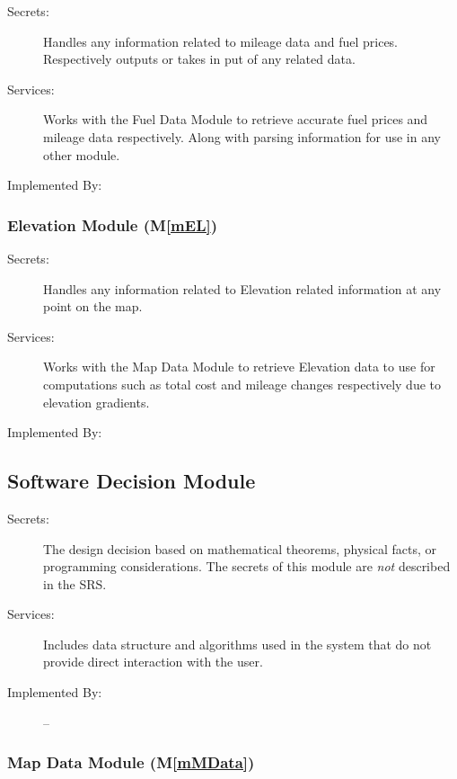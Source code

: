 \documentclass[12pt, titlepage]{article}
\newcommand{\mref}[1]{M\ref{#1}}
\begin{document}
\begin{description}
\item[Secrets:] Handles any information related to mileage data and fuel prices. Respectively 
outputs or takes in put of any related data.
\item[Services:] Works with the Fuel Data Module to retrieve accurate fuel prices and mileage 
data respectively. Along with parsing information for use in any other module.
\item[Implemented By:] \progname{}
\end{description}

\subsubsection{Elevation Module (\mref{mEL})}

\begin{description}
\item[Secrets:] Handles any information related to Elevation related information at any point 
on the map.
\item[Services:] Works with the Map Data Module to retrieve Elevation data to use for computations 
such as total cost and mileage changes respectively due to elevation gradients.
\item[Implemented By:] \progname{}
\end{description}


\subsection{Software Decision Module}

\begin{description}
\item[Secrets:] The design decision based on mathematical theorems, physical
  facts, or programming considerations. The secrets of this module are
  \emph{not} described in the SRS.
\item[Services:] Includes data structure and algorithms used in the system that
  do not provide direct interaction with the user. 
\item[Implemented By:] --
\end{description}

\subsubsection{Map Data Module (\mref{mMData})}
\end{document}
